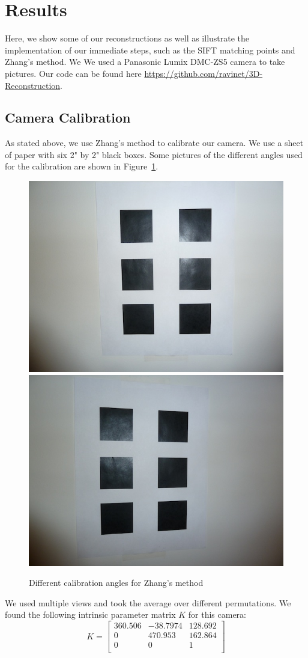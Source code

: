 \section{Results}
\label{s:results}

Here, we show some of our reconstructions as well as illustrate the implementation of our immediate steps, such as the SIFT matching points and Zhang's method. We We used a Panasonic Lumix DMC-ZS5 camera to take pictures. Our code can be found here \url{https://github.com/ravinet/3D-Reconstruction}.

\subsection{Camera Calibration}
As stated above, we use Zhang's method to calibrate our camera. We use a sheet of paper with six 2" by 2" black boxes. Some pictures of the different angles used for the calibration are shown in Figure~\ref{calib_pics}. 

\begin{figure}[H]
\begin{center}
\includegraphics[width=0.45\linewidth]{figures/calib1.jpg}
\includegraphics[width=0.45\linewidth]{figures/calib2.jpg}
\end{center}
\caption{Different calibration angles for Zhang's method}
\label{calib_pics}
\end{figure}

We used multiple views and took the average over different permutations. We found the following intrinsic parameter matrix $K$ for this camera:
\begin{equation*}
K =
  \left[ {\begin{array}{ccc}
   360.506 & -38.7974 & 128.692  \\
  0 & 470.953 & 162.864 \\
   0 & 0 & 1 \\
  \end{array} } \right]
\end{equation*}

